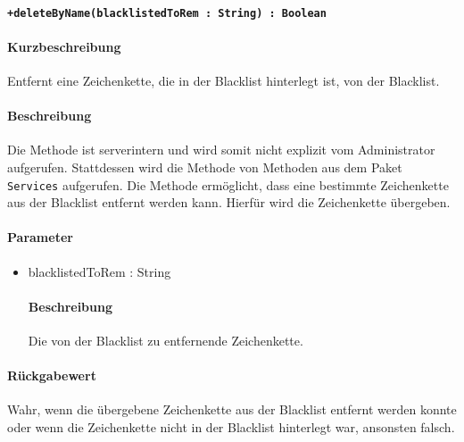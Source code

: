 \paragraph*{\texttt{+deleteByName(blacklistedToRem : String) : Boolean}}%
\paragraph*{Kurzbeschreibung}
Entfernt eine Zeichenkette, die in der Blacklist hinterlegt ist, von der Blacklist.
\paragraph*{Beschreibung}
Die Methode ist serverintern und wird somit nicht explizit vom Administrator aufgerufen.
Stattdessen wird die Methode von Methoden aus dem Paket \texttt{Services} aufgerufen.
Die Methode ermöglicht, dass eine bestimmte Zeichenkette aus der Blacklist entfernt werden kann.
Hierfür wird die Zeichenkette übergeben.
\paragraph*{Parameter}
\begin{itemize}
    \item blacklistedToRem : String
    		\paragraph*{Beschreibung}
    		Die von der Blacklist zu entfernende Zeichenkette.
\end{itemize}
\paragraph*{Rückgabewert}
Wahr, wenn die übergebene Zeichenkette aus der Blacklist entfernt werden konnte oder wenn die Zeichenkette nicht in der Blacklist hinterlegt war, ansonsten falsch.
